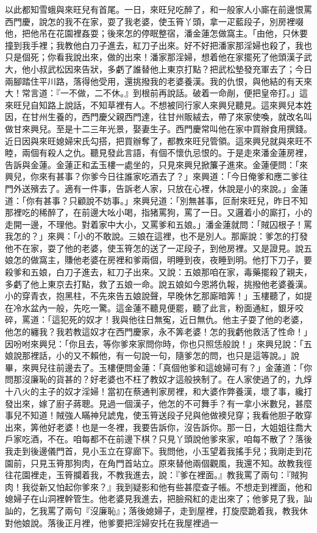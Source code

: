 以此都知雪蛾與來旺兒有首尾。一日，來旺兒吃醉了，和一般家人小廝在前邊恨罵西門慶，說怎的我不在家，耍了我老婆，使玉筲丫頭，拿一疋藍段子，別房裡啜他，把他吊在花園裡姦耍；後來怎的停眠整宿，潘金蓮怎做窩主。「由他，只休要撞到我手裡；我教他白刀子進去，紅刀子出來。好不好把潘家那淫婦也殺了，我也只是個死；你看我說出來，做的出來！潘家那淫婦，想着他在家擺死了他頭漢子武大，他小叔武松因來告狀，多虧了誰替他上東京打點？把武松墊發充軍去了；今日兩腳踏住平川路，落得他受用，還挑撥我的老婆養漢。我的仇恨，與他結的有天來大！常言道：『一不做，二不休。』到根前再說話。破着一命剮，便把皇帝打。」這來旺兒自知路上說話，不知草裡有人。不想被同行家人來興兒聽見。這來興兒本姓因，在甘州生養的，西門慶父親西門達，往甘州販絨去，帶了來家使喚，就改名叫做甘來興兒。至是十二三年光景，娶妻生子。西門慶常叫他在家中買辦食用撰錢。近日因與來旺媳婦宋氏勾搭，把買辦奪了，都教來旺兒管領。這來興兒就與來旺不睦，兩個有殺人之仇。聽見發此言語，有個不懷仇忌恨的。于是走來潘金蓮房裡，告訴與金蓮。金蓮正和孟玉樓一處坐的，只見來興兒掀簾子進來。金蓮便問：「來興兒，你來有甚事？你爹今日往誰家吃酒去了？」來興道：「今日俺爹和應二爹往門外送殯去了。適有一件事，告訴老人家，只放在心裡，休說是小的來說。」金蓮道：「你有甚事？只顧說不妨事。」來興兒道：「別無甚事，叵耐來旺兒，昨日不知那裡吃的稀醉了，在前邊大吆小喝，指猪罵狗，罵了一日。又邏着小的廝打，小的走開一邊，不理他。對着家中大小，又罵爹和五娘。」潘金蓮就問：「賊囚根子！罵我怎的？」來興：「小的不敢說。三娘在這裡，也不是別人。那廝說：爹怎的打發他不在家，耍了他的老婆，使玉筲怎的送了一疋段子，到他房裡。又是證見。說五娘怎的做窩主，賺他老婆在房裡和爹兩個，明睡到夜，夜睡到明。他打下刀子，要殺爹和五娘，白刀子進去，紅刀子出來。又說：五娘那咱在家，毒藥擺殺了親夫，多虧了他上東京去打點，救了五娘一命。說五娘如今恩將仇報，挑撥他老婆養漢。小的穿青衣，抱黑柱，不先來告五娘說聲，早晚休乞那廝暗筭！」玉樓聽了，如提在冷水盆內一般，先吃一驚。這金蓮不聽見便罷，聽了此言，粉面通紅，銀牙咬碎，罵道：「這犯死的奴才！我與他往日無寃，近日無仇。他主子耍了他的老婆，他怎的纏我？我若教這奴才在西門慶家，永不筭老婆！怎的我虧他救活了性命！」因吩咐來興兒：「你且去，等你爹來家問你時，你也只照恁般說！」來興兒說：「五娘說那裡話，小的又不賴他，有一句說一句，隨爹怎的問，也只是這等說。」說畢，來興兒往前邊去了。玉樓便問金蓮：「真個他爹和這媳婦可有？」金蓮道：「你問那沒廉恥的貨甚的？好老婆也不枉了教奴才這般挾制了。在人家使過了的，九焞十八火的主子的奴才淫婦！當初在蔡通判家房裡，和大婆作弊養漢，壞了事，纔打發出來，嫁了廚子蔣聰。見過一個漢子，他怎的不可舞手？有一拿小米數兒，甚麼事兒不知道！賊強人瞞神兒諕鬼，使玉筲送段子兒與他做襖兒穿；我看他胆子敢穿出來，筭他好老婆！也是一冬裡，我要告訴你，沒告訴你。那一日，大姐姐往喬大戶家吃酒，不在。咱每都不在前邊下棋？只見丫頭說他爹來家，咱每不散了？落後我走到後邊儀門首，見小玉立在穿廊下。我問他，小玉望着我搖手兒；我剛走到花園前，只見玉筲那狗肉，在角門首站立。原來替他兩個觀風，我還不知。故教我徑往花園裡走，玉筲攔着我，不教我進去，說：『爹在裡面。』教我罵了兩句：『賊狗肉！我從新又怕起你爹來？』我到疑影和他有些甚麼查子帳。不想走到裡面，他和媳婦子在山洞裡幹管生。他老婆見我進去，把臉飛紅的走出來了；他爹見了我，訕訕的，乞我罵了兩句『沒廉恥』；落後媳婦子，走到屋裡，打旋麼跪着我，教我休對他娘說。落後正月裡，他爹要把淫婦安托在我屋裡過一